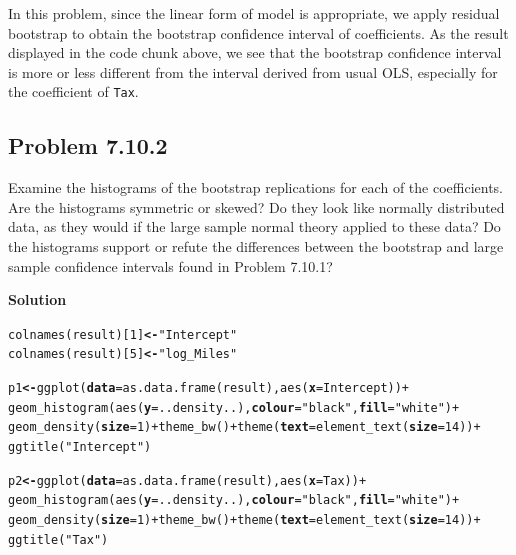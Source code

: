 \documentclass[12pt,oneside,a4paper]{article}\usepackage[]{graphicx}\usepackage[]{xcolor}
\makeatletter
\newcommand{\hlnum}[1]{\textcolor[rgb]{0,0,0}{#1}}%
\newcommand{\hlstr}[1]{\textcolor[rgb]{0,0,1}{#1}}%
\newcommand{\hlopt}[1]{\textcolor[rgb]{0,0,0}{#1}}%
\newcommand{\hlstd}[1]{\textcolor[rgb]{0,0,0}{#1}}%
\newcommand{\hlkwb}[1]{\textcolor[rgb]{0.498,0,0.333}{\textbf{#1}}}%
\newcommand{\hlkwc}[1]{\textcolor[rgb]{0.498,0,0.333}{\textbf{#1}}}%
\newcommand{\hlkwd}[1]{\textcolor[rgb]{0,0,0}{#1}}%
\newenvironment{kframe}{%
 \def\at@end@of@kframe{}%
 \ifinner\ifhmode%
  \def\at@end@of@kframe{\end{minipage}}%
  \begin{minipage}{\columnwidth}%
 \fi\fi%
 \def\FrameCommand##1{\hskip\@totalleftmargin \hskip-\fboxsep
 \colorbox{shadecolor}{##1}\hskip-\fboxsep
     \hskip-\linewidth \hskip-\@totalleftmargin \hskip\columnwidth}%
 \MakeFramed {\advance\hsize-\width
   \@totalleftmargin\z@ \linewidth\hsize
   \@setminipage}}%
 {\par\unskip\endMakeFramed%
 \at@end@of@kframe}
\newenvironment{knitrout}{}{} %
\newcommand{\subproblem}[1]
{
    \subsection*{Problem {#1}}
}
\newcommand{\solution}
{
    \vspace{15pt}
    \noindent\ignorespaces\textbf{\large Solution}\par
}
\newcommand{\m}[1]{\texttt{{#1}}}
\makeatother
\begin{document}
In this problem, since the linear form of model is appropriate, we apply residual bootstrap to obtain the bootstrap confidence interval of coefficients. As the result displayed in the code chunk above, we see that the bootstrap confidence interval is more or less different from the interval derived from usual OLS, especially for the coefficient of \m{Tax}.

\subproblem{7.10.2}
Examine the histograms of the bootstrap replications for each of the coefficients. Are the histograms symmetric or skewed? Do they look like normally distributed data, as they would if the large sample normal theory applied to these data? Do the histograms support or refute the differences between the bootstrap and large sample confidence intervals found in Problem 7.10.1?

\solution
\begin{knitrout}
\color{fgcolor}\begin{kframe}
\begin{alltt}
\hlkwd{colnames}\hlstd{(result)[}\hlnum{1}\hlstd{]} \hlkwb{<-} \hlstr{"Intercept"}
\hlkwd{colnames}\hlstd{(result)[}\hlnum{5}\hlstd{]} \hlkwb{<-} \hlstr{"log_Miles"}

\hlstd{p1} \hlkwb{<-} \hlkwd{ggplot}\hlstd{(}\hlkwc{data} \hlstd{=} \hlkwd{as.data.frame}\hlstd{(result),} \hlkwd{aes}\hlstd{(}\hlkwc{x} \hlstd{= Intercept))} \hlopt{+}
    \hlkwd{geom_histogram}\hlstd{(}\hlkwd{aes}\hlstd{(}\hlkwc{y} \hlstd{= ..density..),} \hlkwc{colour} \hlstd{=} \hlstr{"black"}\hlstd{,} \hlkwc{fill} \hlstd{=} \hlstr{"white"}\hlstd{)} \hlopt{+}
    \hlkwd{geom_density}\hlstd{(}\hlkwc{size} \hlstd{=} \hlnum{1}\hlstd{)} \hlopt{+} \hlkwd{theme_bw}\hlstd{()} \hlopt{+} \hlkwd{theme}\hlstd{(}\hlkwc{text} \hlstd{=} \hlkwd{element_text}\hlstd{(}\hlkwc{size} \hlstd{=} \hlnum{14}\hlstd{))} \hlopt{+}
    \hlkwd{ggtitle}\hlstd{(}\hlstr{"Intercept"}\hlstd{)}

\hlstd{p2} \hlkwb{<-} \hlkwd{ggplot}\hlstd{(}\hlkwc{data} \hlstd{=} \hlkwd{as.data.frame}\hlstd{(result),} \hlkwd{aes}\hlstd{(}\hlkwc{x} \hlstd{= Tax))} \hlopt{+}
    \hlkwd{geom_histogram}\hlstd{(}\hlkwd{aes}\hlstd{(}\hlkwc{y} \hlstd{= ..density..),} \hlkwc{colour} \hlstd{=} \hlstr{"black"}\hlstd{,} \hlkwc{fill} \hlstd{=} \hlstr{"white"}\hlstd{)} \hlopt{+}
    \hlkwd{geom_density}\hlstd{(}\hlkwc{size} \hlstd{=} \hlnum{1}\hlstd{)} \hlopt{+} \hlkwd{theme_bw}\hlstd{()} \hlopt{+} \hlkwd{theme}\hlstd{(}\hlkwc{text} \hlstd{=} \hlkwd{element_text}\hlstd{(}\hlkwc{size} \hlstd{=} \hlnum{14}\hlstd{))} \hlopt{+}
    \hlkwd{ggtitle}\hlstd{(}\hlstr{"Tax"}\hlstd{)}


\end{alltt}
\end{kframe}
\end{knitrout}
\end{document}
